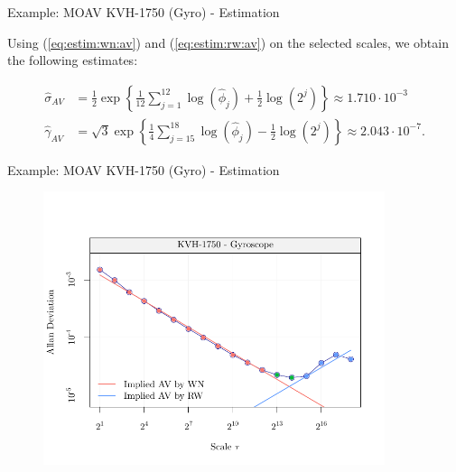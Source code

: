 \documentclass[envcountsect,usenames,dvipsnames]{beamer}
\theoremstyle{mystyle}
\begin{document}
\begin{frame}{Example: MOAV KVH-1750 (Gyro) - Estimation}

Using (\ref{eq:estim:wn:av}) and (\ref{eq:estim:rw:av}) on the selected scales, we obtain the following estimates:

\begin{equation*}
    \begin{aligned}
         \hat{\sigma}_{AV} &= \frac{1}{2} \exp \left\{\frac{1}{12} \sum_{j = 1}^{12} \log \left(\hat{\phi}_j\right)+ \frac{1}{2} \log \left(2^j\right)\right\} \approx 1.710 \cdot 10^{-3}\\
         \hat{\gamma}_{AV} &= \sqrt{3} \exp \left\{\frac{1}{4} \sum_{j = 15}^{18} \log \left(\hat{\phi}_j\right)- \frac{1}{2} \log \left(2^j\right)\right\} \approx 2.043 \cdot 10^{-7}.
    \end{aligned}
\end{equation*}
\end{frame}

\begin{frame}{Example: MOAV KVH-1750 (Gyro) - Estimation}
\vspace{-0.75cm}
    \begin{figure}
	    \centering
	  \includegraphics[width = 10cm]{Images/av_example_kvh_part3.pdf}
	\end{figure}
\end{frame}
\end{document}
